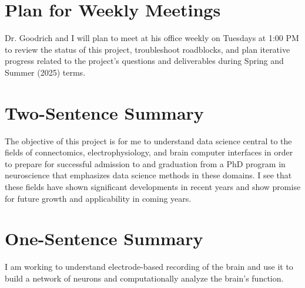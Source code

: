\documentclass[11pt]{article}
\newcommand{\sectionwithindent}[1]{%
    \section*{#1}%
    \hspace{\parindent} %
}
\begin{document}
\sectionwithindent{Plan for Weekly Meetings}
Dr. Goodrich and I will plan to meet at his office weekly on Tuesdays at 1:00 PM to review the status of this project, troubleshoot roadblocks, and plan iterative progress related to the project's questions and deliverables during Spring and Summer (2025) terms.

\sectionwithindent{Two-Sentence Summary}
The objective of this project is for me to understand data science central to the fields of connectomics, electrophysiology, and brain computer interfaces in order to prepare for successful admission to and graduation from a PhD program in neuroscience that emphasizes data science methods in these domains. I see that these fields have shown significant developments in recent years and show promise for future growth and applicability in coming years.

\sectionwithindent{One-Sentence Summary}
I am working to understand electrode-based recording of the brain and use it to build a network of neurons and computationally analyze the brain's function.

\newpage
\printbibliography
\end{document}
